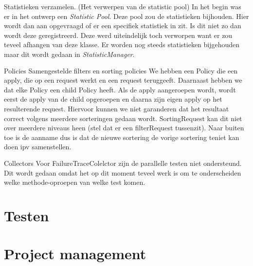 \documentclass[i1]{oss}
\begin{document}
\begin{description}
\item Statistieken verzamelen. (Het verwerpen van de statistic pool)
In het begin was er in het ontwerp een \textit{Statistic Pool}. Deze pool zou de statistieken bijhouden. Hier wordt dan aan opgevraagd of er een specifiek statistiek in zit. Is dit niet zo dan wordt deze geregistreerd. Deze werd uiteindelijk toch verworpen want er zou teveel afhangen van deze klasse. Er worden nog steeds statistieken bijgehouden maar dit wordt gedaan in \textit{StatisticManager}.

\item Policies
Samengestelde filters en sorting policies
We hebben een Policy die een apply, die op een request werkt en een request teruggeeft. Daarnaast hebben we dat elke Policy een child Policy heeft. Als de apply aangeroepen wordt, wordt eerst de apply van de child opgeroepen en daarna zijn eigen apply op het resulterende request. Hiervoor kunnen we niet garanderen dat het resultaat correct volgens meerdere sorteringen gedaan wordt. SortingRequest kan dit niet over meerdere niveaus heen (stel dat er een filterRequest tussenzit). Naar buiten toe is de aanname dus is dat de nieuwe sortering de vorige sortering teniet kan doen ipv samenstellen.

\item Collectors
Voor FailureTraceColelctor zijn de parallelle testen niet ondersteund. Dit wordt gedaan omdat het op dit moment teveel werk is om te onderscheiden welke methode-oproepen van welke test komen.
\end{description}



%

\section{Testen}
\label{ssec:testen}


\section{Project management}
\label{ssec:Projectmanag}
\end{document}
